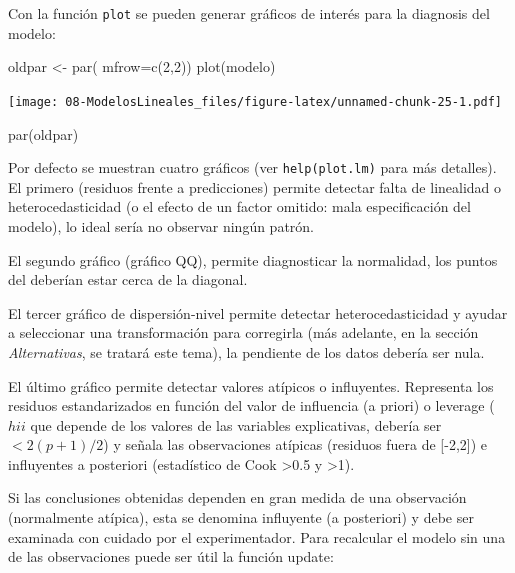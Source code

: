 \documentclass[
]{book}
\newenvironment{Shaded}{\begin{snugshade}}{\end{snugshade}}
\newcommand{\AttributeTok}[1]{\textcolor[rgb]{0.77,0.63,0.00}{#1}}
\newcommand{\DecValTok}[1]{\textcolor[rgb]{0.00,0.00,0.81}{#1}}
\newcommand{\FunctionTok}[1]{\textcolor[rgb]{0.00,0.00,0.00}{#1}}
\newcommand{\NormalTok}[1]{#1}
\newcommand{\OtherTok}[1]{\textcolor[rgb]{0.56,0.35,0.01}{#1}}
\theoremstyle{break}
\theoremstyle{nonumberplain}
\begin{document}
Con la función \texttt{plot} se pueden generar gráficos de interés para la diagnosis del modelo:

\begin{Shaded}
\begin{Highlighting}[]
\NormalTok{oldpar }\OtherTok{\textless{}{-}} \FunctionTok{par}\NormalTok{( }\AttributeTok{mfrow=}\FunctionTok{c}\NormalTok{(}\DecValTok{2}\NormalTok{,}\DecValTok{2}\NormalTok{))}
\FunctionTok{plot}\NormalTok{(modelo)}
\end{Highlighting}
\end{Shaded}

\texttt{[image: 08-ModelosLineales\_files/figure-latex/unnamed-chunk-25-1.pdf]}

\begin{Shaded}
\begin{Highlighting}[]
\FunctionTok{par}\NormalTok{(oldpar)}
\end{Highlighting}
\end{Shaded}

Por defecto se muestran cuatro gráficos (ver \texttt{help(plot.lm)} para más detalles). El primero (residuos frente a predicciones) permite detectar falta de
linealidad o heterocedasticidad (o el efecto de un factor omitido: mala
especificación del modelo), lo ideal sería no observar ningún patrón.

El segundo gráfico (gráfico QQ), permite diagnosticar la normalidad, los puntos del deberían estar cerca de la diagonal.

El tercer gráfico de dispersión-nivel permite detectar heterocedasticidad y ayudar a seleccionar una transformación para corregirla (más adelante, en la sección \emph{Alternativas}, se tratará este tema), la pendiente de los datos debería ser nula.

El último gráfico permite detectar valores atípicos o influyentes. Representa los residuos estandarizados en función del valor de influencia (a priori) o leverage (\(hii\) que depende de los valores de las variables explicativas, debería ser \(< 2(p+1)/2\)) y señala las observaciones atípicas (residuos fuera de {[}-2,2{]}) e influyentes a posteriori (estadístico de Cook \textgreater0.5 y \textgreater1).

Si las conclusiones obtenidas dependen en gran medida de una
observación (normalmente atípica), esta se denomina influyente (a
posteriori) y debe ser examinada con cuidado por el experimentador.
Para recalcular el modelo sin una de las observaciones puede ser útil la función update:
\end{document}
